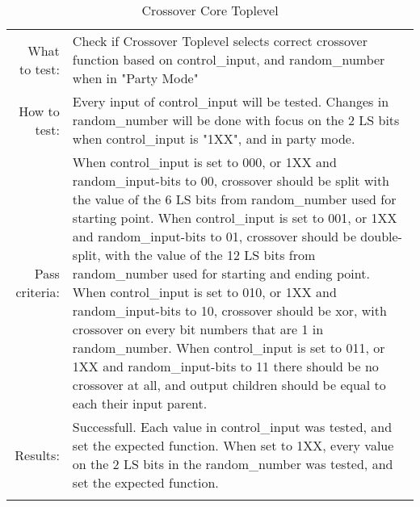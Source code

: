\begin{table}[H]
  \begin{tabular}{r | p{9cm}}
    \noalign{\smallskip}\hline\noalign{\smallskip}
    
    What to test:  & Check if Crossover Toplevel selects correct crossover function
                     based on control\_input, and random\_number when in "Party Mode"\\

    \noalign{\smallskip}\hline\noalign{\smallskip}

    How to test:   &    Every input of control\_input will be tested.
                        Changes in random\_number will be done with focus on the 2 LS 
                        bits when control\_input is "1XX", and in party mode.
                        \\
                      
    \noalign{\smallskip}\hline\noalign{\smallskip}

    Pass criteria: &    When control\_input is set to 000, or 1XX and random\_input-bits 
                        to 00, crossover should be split with the value of the 6 LS bits 
                        from random\_number used for starting point.
                        When control\_input is set to 001, or 1XX and random\_input-bits 
                        to 01, crossover should be double-split, with the value of the 
                        12 LS bits from random\_number used for starting and ending 
                        point.
                        When control\_input is set to 010, or 1XX and random\_input-bits 
                        to 10, crossover should be xor, with crossover on every bit 
                        numbers that are 1 in random\_number.
                        When control\_input is set to 011, or 1XX and random\_input-bits 
                        to 11 there should be no crossover at all, and output children 
                        should be equal to each their input parent.
                        \\
    \noalign{\smallskip}\hline\noalign{\smallskip}
    
    Results: &      Successfull. 
                    Each value in control\_input was tested, and set the expected 
                    function. When set to 1XX, every value on the 2 LS bits in the 
                    random\_number was tested, and set the expected function.
                    \\
   \noalign{\smallskip}\hline\noalign{\smallskip}
  
  
  
  \end{tabular}
  \caption{Crossover Core Toplevel}
  \label{testing:components:genetic_pipeline:crossover_core_toplevel}
\end{table}
